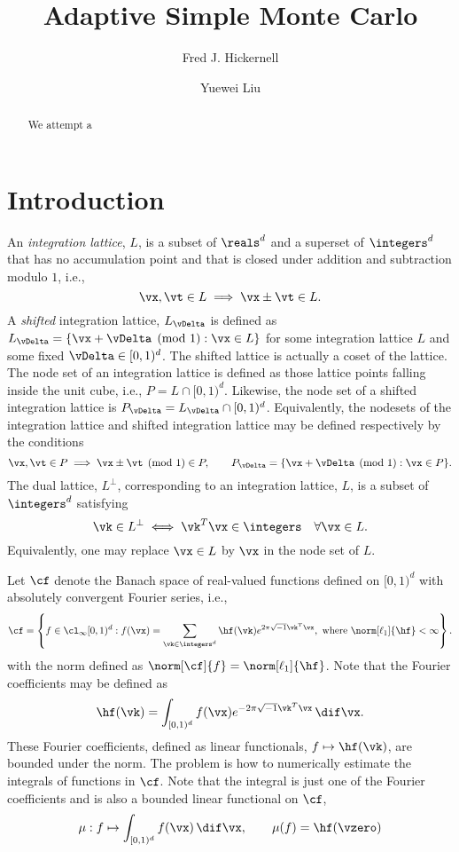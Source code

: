 \documentclass[12pt]{amsart}
\newcommand{\cubed}{[0,1)^d}
\theoremstyle{definition}
\begin{document}
\title{Adaptive Simple Monte Carlo}
\author{Fred J. Hickernell}
\author{Yuewei Liu}
\address{Room E1-208, Department of Applied Mathematics, Illinois Institute of Technology, 10 W.\ 32$^{\text{nd}}$ St., Chicago, IL 60616}
\address{School of Mathematics and Statistics, Lanzhou University, Lanzhou City, Gansu, China 730000}
\begin{abstract}We attempt a 
\end{abstract}
\maketitle


\section{Introduction}

An \emph{integration lattice}, $L$, is a subset of $\reals^d$ and a superset of $\integers^d$ that has no accumulation point and that is closed under addition and subtraction modulo $1$, i.e., 
\[
\vx, \vt \in L \implies \vx \pm \vt \in L.
\]  
A \emph{shifted} integration lattice, $L_{\vDelta}$ is defined as $L_{\vDelta} = \{ \vx +\vDelta \pmod 1 : \vx \in L\}$ for some integration lattice $L$ and some fixed $\vDelta \in \cubed$.  The shifted lattice is actually a coset of the lattice.  The node set of an integration lattice is defined as those lattice points falling inside the unit cube, i.e., $P = L \cap \cubed$.  Likewise, the node set of a shifted integration lattice is $P_{\vDelta}= L_{\vDelta} \cap \cubed$.  Equivalently, the nodesets of the integration lattice and shifted integration lattice may be defined respectively by the conditions
\[
\vx, \vt \in P \implies \vx \pm \vt \pmod 1 \in P, \qquad P_{\vDelta} = \{ \vx +\vDelta \pmod 1 : \vx \in P\}.
\]  
The dual lattice, $L^{\perp}$, corresponding to an integration lattice, $L$, is a subset of $\integers^d$ satisfying
\[
\vk \in L^{\perp} \iff \vk^T\vx \in \integers \quad \forall \vx \in L.
\]  
Equivalently, one may replace $\vx \in L$ by $\vx$ in the node set of $L$.

Let $\cf$ denote the Banach space of real-valued functions defined on $\cubed$ with absolutely convergent Fourier series, i.e., 
\[
\cf = \left \{ f \in \cl_{\infty}\cubed : f(\vx) = \sum_{\vk \in \integers^d} \hf(\vk) e^{2 \pi \sqrt{-1} \vk^T \vx}, \ \text{where } \norm[\ell_1]{\hf} <  \infty\right\}.
\]
with the norm defined as $\norm[\cf]{f}=\norm[\ell_1]{\hf}$.  Note that the Fourier coefficients may be defined as 
\[
\hf(\vk) = \int_{\cubed} f(\vx) e^{-2 \pi \sqrt{-1} \vk^T \vx} \, \dif \vx.
\]
These Fourier coefficients, defined as linear functionals, $f \mapsto \hf(\vk)$, are bounded under the norm.  The problem is how to numerically estimate the integrals of functions in $\cf$.  Note that the integral is just one of the Fourier coefficients and is also a bounded linear functional on $\cf$,
\[
\mu : f \mapsto \int_{\cubed} f(\vx) \, \dif \vx, \qquad \mu(f) = \hf(\vzero) 
\]
\end{document}
